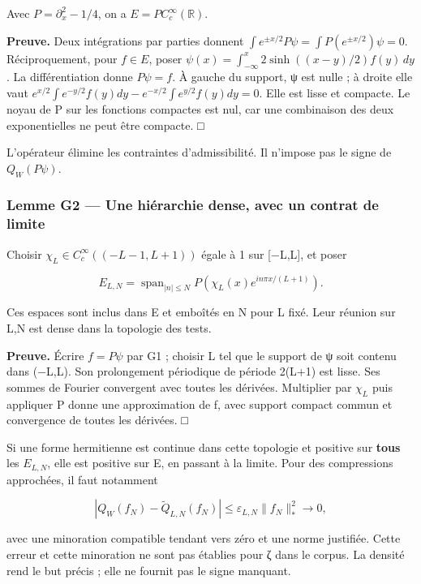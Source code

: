\documentclass[
  10pt,
  a4paper,
]{article}
\begin{document}
Avec \(P=\partial_x^2-1/4\), on a \(E=P C_c^\infty(\mathbb R)\).

\textbf{Preuve.} Deux intégrations par parties donnent
\(\int e^{\pm x/2}P\psi=\int P(e^{\pm x/2})\psi=0\). Réciproquement,
pour \(f\in E\), poser
\(\psi(x)=\int_{-\infty}^x2\sinh((x-y)/2)f(y)\,dy\). La différentiation
donne \(P\psi=f\). À gauche du support, ψ est nulle ; à droite elle vaut
\(e^{x/2}\int e^{-y/2}f(y)dy-e^{-x/2}\int e^{y/2}f(y)dy=0\). Elle est
lisse et compacte. Le noyau de P sur les fonctions compactes est nul,
car une combinaison des deux exponentielles ne peut être compacte. □

L'opérateur élimine les contraintes d'admissibilité. Il n'impose pas le
signe de \(Q_W(P\psi)\).

\hypertarget{lemme-g2-une-hiuxe9rarchie-dense-avec-un-contrat-de-limite}{%
\subsubsection{Lemme G2 --- Une hiérarchie dense, avec un contrat de
limite}\label{lemme-g2-une-hiuxe9rarchie-dense-avec-un-contrat-de-limite}}

Choisir \(\chi_L\in C_c^\infty((-L-1,L+1))\) égale à 1 sur {[}−L,L{]},
et poser

\[
E_{L,N}=\operatorname{span}_{|n|\le N}
P\left(\chi_L(x)e^{in\pi x/(L+1)}\right).
\]

Ces espaces sont inclus dans E et emboîtés en N pour L fixé. Leur
réunion sur L,N est dense dans la topologie des tests.

\textbf{Preuve.} Écrire \(f=P\psi\) par G1 ; choisir L tel que le
support de ψ soit contenu dans (−L,L). Son prolongement périodique de
période 2(L+1) est lisse. Ses sommes de Fourier convergent avec toutes
les dérivées. Multiplier par \(\chi_L\) puis appliquer P donne une
approximation de f, avec support compact commun et convergence de toutes
les dérivées. □

Si une forme hermitienne est continue dans cette topologie et positive
sur \textbf{tous} les \(E_{L,N}\), elle est positive sur E, en passant à
la limite. Pour des compressions approchées, il faut notamment

\[
|Q_W(f_N)-\widetilde Q_{L,N}(f_N)|
\le\varepsilon_{L,N}\|f_N\|_*^2\longrightarrow0,
\]

avec une minoration compatible tendant vers zéro et une norme justifiée.
Cette erreur et cette minoration ne sont pas établies pour ζ dans le
corpus. La densité rend le but précis ; elle ne fournit pas le signe
manquant.
\end{document}
